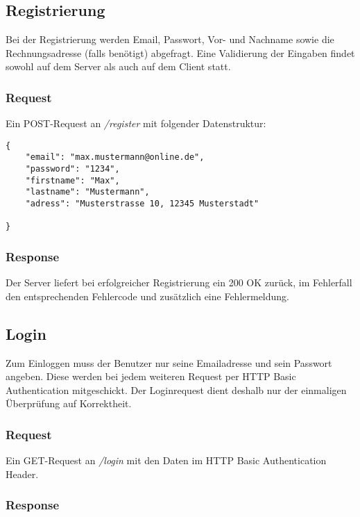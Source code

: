 \documentclass[ngerman,titlepage]{scrartcl}
\begin{document}
	\subsection{Registrierung}
	
	Bei der Registrierung werden Email, Passwort, Vor- und Nachname sowie die Rechnungsadresse (falls benötigt) abgefragt. 
	Eine Validierung der Eingaben findet sowohl auf dem Server als auch auf dem Client statt.
	
		\subsubsection*{Request}
		
		Ein POST-Request an \textit{/register} mit folgender Datenstruktur:
		
		\begin{lstlisting}
{
	"email": "max.mustermann@online.de",
	"password": "1234",
	"firstname": "Max",
	"lastname": "Mustermann",
	"adress": "Musterstrasse 10, 12345 Musterstadt"
	
}
		\end{lstlisting}
		
		\subsubsection*{Response}
		
		Der Server liefert bei erfolgreicher Registrierung ein 200 OK zurück, im Fehlerfall den entsprechenden Fehlercode und zusätzlich eine Fehlermeldung.
		
	\subsection{Login}
	
	Zum Einloggen muss der Benutzer nur seine Emailadresse und sein Passwort angeben.
	Diese werden bei jedem weiteren Request per HTTP Basic Authentication mitgeschickt.
	Der Loginrequest dient deshalb nur der einmaligen Überprüfung auf Korrektheit.
	
		\subsubsection*{Request}
		
		Ein GET-Request an \textit{/login} mit den Daten im HTTP Basic Authentication Header.
		
		\subsubsection*{Response}
		
\end{document}
